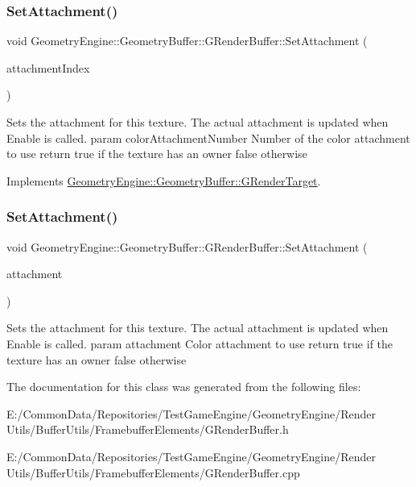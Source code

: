 \subsubsection{\texorpdfstring{SetAttachment()}{SetAttachment()}\hspace{0.1cm}{\footnotesize\ttfamily [1/2]}}
{\footnotesize\ttfamily void Geometry\+Engine\+::\+Geometry\+Buffer\+::\+G\+Render\+Buffer\+::\+Set\+Attachment (\begin{DoxyParamCaption}\item[{unsigned int}]{attachment\+Index }\end{DoxyParamCaption})\hspace{0.3cm}{\ttfamily [virtual]}}

Sets the attachment for this texture. The actual attachment is updated when Enable is called. param color\+Attachment\+Number Number of the color attachment to use return true if the texture has an owner false otherwise 

Implements \mbox{\hyperlink{class_geometry_engine_1_1_geometry_buffer_1_1_g_render_target_a1031c44ad374654e2183d3b1b99638a3}{Geometry\+Engine\+::\+Geometry\+Buffer\+::\+G\+Render\+Target}}.

\mbox{\label{class_geometry_engine_1_1_geometry_buffer_1_1_g_render_buffer_ae69412d2730060177ad8479a6a4d313c}} 
\subsubsection{\texorpdfstring{SetAttachment()}{SetAttachment()}\hspace{0.1cm}{\footnotesize\ttfamily [2/2]}}
{\footnotesize\ttfamily void Geometry\+Engine\+::\+Geometry\+Buffer\+::\+G\+Render\+Buffer\+::\+Set\+Attachment (\begin{DoxyParamCaption}\item[{G\+Framebuffer\+Commons\+::\+G\+\_\+\+C\+O\+L\+O\+R\+\_\+\+A\+T\+T\+A\+C\+H\+M\+E\+N\+TS}]{attachment }\end{DoxyParamCaption})}

Sets the attachment for this texture. The actual attachment is updated when Enable is called. param attachment Color attachment to use return true if the texture has an owner false otherwise 

The documentation for this class was generated from the following files\+:\begin{DoxyCompactItemize}
\item 
E\+:/\+Common\+Data/\+Repositories/\+Test\+Game\+Engine/\+Geometry\+Engine/\+Render Utils/\+Buffer\+Utils/\+Framebuffer\+Elements/G\+Render\+Buffer.\+h\item 
E\+:/\+Common\+Data/\+Repositories/\+Test\+Game\+Engine/\+Geometry\+Engine/\+Render Utils/\+Buffer\+Utils/\+Framebuffer\+Elements/G\+Render\+Buffer.\+cpp\end{DoxyCompactItemize}
